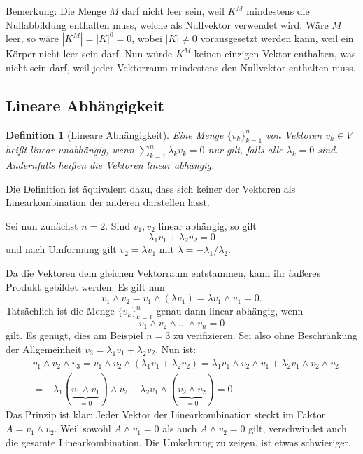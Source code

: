 \documentclass[a4paper,11pt,fleqn,twoside]{scrartcl}
\numberwithin{equation}{section}
\theoremstyle{rmbox}
\newtheorem{Definition}{Definition}
\begin{document}
Bemerkung: Die Menge $M$ darf nicht leer sein, weil $K^M$ mindestens
die Nullabbildung enthalten muss, welche als Nullvektor verwendet
wird. Wäre $M$ leer, so wäre $|K^M|=|K|^0=0$, wobei $|K|\ne 0$
vorausgesetzt werden kann, weil ein Körper nicht leer sein darf.
Nun würde $K^M$ keinen einzigen Vektor enthalten, was nicht sein darf,
weil jeder Vektorraum mindestens den Nullvektor enthalten muss.

\subsection{Lineare Abhängigkeit}
\begin{Definition}[Lineare Abhängigkeit]
Eine Menge $\{v_k\}_{k=1}^n$ von Vektoren $v_k\in V$ heißt
\emph{linear unabhängig}, wenn $\sum_{k=1}^n \lambda_k v_k=0$ nur
gilt, falls alle $\lambda_k=0$ sind. Andernfalls heißen die Vektoren
\emph{linear abhängig}.
\end{Definition}

\noindent
Die Definition ist äquivalent dazu, dass sich keiner der Vektoren
als Linearkombination der anderen darstellen lässt.

Sei nun zunächst $n=2$. Sind $v_1,v_2$ linear abhängig, so gilt
\begin{equation}
\lambda_1 v_1+\lambda_2 v_2 = 0
\end{equation}
und nach Umformung gilt $v_2=\lambda v_1$ mit
$\lambda=-\lambda_1/\lambda_2$.

Da die Vektoren dem gleichen Vektorraum entstammen, kann ihr
äußeres Produkt gebildet werden. Es gilt nun
\begin{equation}
v_1\wedge v_2 = v_1\wedge (\lambda v_1) = \lambda v_1\wedge v_1 = 0.
\end{equation}
Tatsächlich ist die Menge $\{v_k\}_{k=1}^n$ genau dann linear
abhängig, wenn
\begin{equation}
v_1\wedge v_2\wedge\ldots\wedge v_n = 0
\end{equation}
gilt. Es genügt, dies am Beispiel $n=3$ zu verifizieren. Sei also
ohne Beschränkung der Allgemeinheit $v_3=\lambda_1 v_1+\lambda_2 v_2$.
Nun ist:
\begin{align}
&v_1\wedge v_2\wedge v_3
= v_1\wedge v_2\wedge(\lambda_1 v_1+\lambda_2 v_2)
= \lambda_1 v_1\wedge v_2\wedge v_1
+ \lambda_2 v_1\wedge v_2\wedge v_2\\
&= -\lambda_1 (\underbrace{v_1\wedge v_1}_{=0})\wedge v_2
+ \lambda_2 v_1\wedge (\underbrace{v_2\wedge v_2}_{=0})
= 0.
\end{align}
Das Prinzip ist klar: Jeder Vektor der Linearkombination steckt
im Faktor $A=v_1\wedge v_2$. Weil sowohl $A\wedge v_1=0$ als auch
$A\wedge v_2=0$ gilt, verschwindet auch die gesamte Linearkombination.
Die Umkehrung zu zeigen, ist etwas schwieriger.
\end{document}
